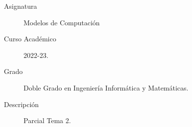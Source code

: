\documentclass[12pt]{article}
\begin{document}

    
    

    \begin{description}
        \item[Asignatura] Modelos de Computación
        \item[Curso Académico] 2022-23.
        \item[Grado] Doble Grado en Ingeniería Informática y Matemáticas.
        \item[Descripción] Parcial Tema 2.
    \end{description}
    \newpage
    
\end{document}
